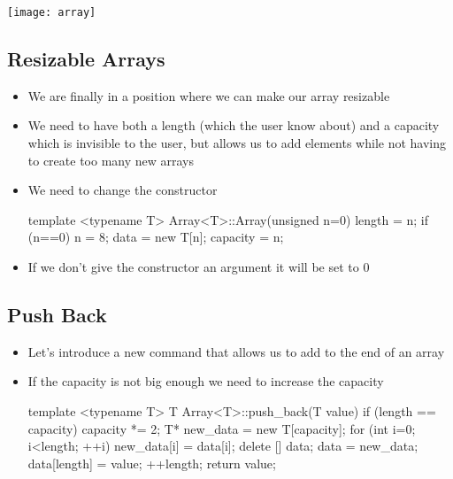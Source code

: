 

\vspace*{-2cm}
\begin{center}
  \texttt{[image: array]}
\end{center}
\vspace*{-1cm}


\begin{slide}
\section[-2]{Resizable Arrays}

\begin{itemize}
\item We are finally in a position where we can make our array
  resizable
\item We need to have both a length (which the user know about) and a
  capacity which is invisible to the user, but allows us to add
  elements while not having to create too many new arrays
\item We need to change the constructor
  \begin{cpp}
  template <typename T>
  Array<T>::Array(unsigned n=0) {
    length = n;
    if (n==0) {
      n = 8;
    }
    data = new T[n];
    capacity = n;
  }
  \end{cpp}
\item If we don't give the constructor an argument it will be set to 0
\end{itemize}
\end{slide}


\begin{slide}
  \section[-2]{Push Back}
  
  \begin{itemize}
  \item Let's introduce a new command that allows us to add to the end
    of an array
  \item If the capacity is not big enough we need to increase the
    capacity
    \begin{cpp}
template <typename T>
T Array<T>::push_back(T value) {
  if (length == capacity) {
    capacity *= 2;
    T* new_data = new T[capacity];
    for (int i=0; i<length; ++i) {
      new_data[i] = data[i];
    }
    delete [] data;
    data = new_data;
  }
  data[length] = value;
  ++length;
  return value;
}
    \end{cpp}
  \end{itemize}
\end{slide}

